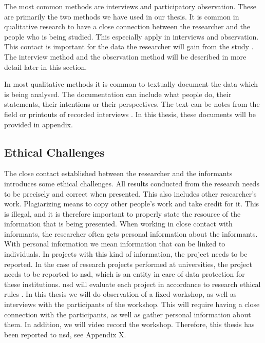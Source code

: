 The most common methods are interviews and participatory observation. These are primarily the two methods we have used in our thesis. It is common in qualitative research to have a close connection between the researcher and the people who is being studied. This especially apply in interviews and observation. This contact is important for the data the researcher will gain from the study \cite{qualitative}. The interview method and the observation method will be described in more detail later in this section.

In most qualitative methods it is common to textually document the data which is being analysed. The documentation can include what people do, their statements, their intentions or their perspectives. The text can be notes from the field or printouts of  recorded interviews \cite{qualitative}. In this thesis, these documents will be provided in appendix.

\subsection{Ethical Challenges}
The close contact established between the researcher and the informants introduces some ethical challenges. All results conducted from the research needs to be precisely and correct when presented. This also includes other researcher's work. Plagiarizing means to copy other people’s work and take credit for it. This is illegal, and it is therefore important to properly state the resource of the information that is being presented.  When working in close contact with informants, the researcher often gets personal information about the informants. With personal information we mean information that can be linked to individuals. In projects with this kind of information, the project needs to be reported. In the case of research projects performed at universities, the project needs to be reported to \ac{nsd}, which is an entity in care of data protection for these institutions. \ac{nsd} will evaluate each project in accordance to research ethical rules \cite{qualitative}. In this thesis we will do observation of a fixed workshop, as well as interviews with the participants of the workshop. This will require having a close connection with the participants, as well as gather personal information about them. In addition, we will video record the workshop. Therefore, this thesis has been reported to \ac{nsd}, see Appendix X. \\ \\
